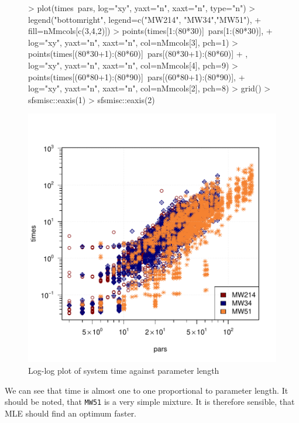 \begin{figure}[h!]
    \begin{Rgraph}[0.9]
\begin{Schunk}
\begin{Sinput}
>     plot(times~pars, log="xy", yaxt="n", xaxt="n", type="n")
>     legend("bottomright", legend=c("MW214", "MW34","MW51"),
+            fill=nMmcols[c(3,4,2)])
>     points(times[1:(80*30)]~pars[1:(80*30)], 
+            log="xy", yaxt="n", xaxt="n", col=nMmcols[3], pch=1)
>     points(times[(80*30+1):(80*60)]~pars[(80*30+1):(80*60)]
+            , log="xy", yaxt="n", xaxt="n", col=nMmcols[4], pch=9)
>     points(times[(60*80+1):(80*90)]~pars[(60*80+1):(80*90)], 
+            log="xy", yaxt="n", xaxt="n", col=nMmcols[2], pch=8)
>     grid()
>     sfsmisc::eaxis(1)
>     sfsmisc::eaxis(2)
\end{Sinput}
\end{Schunk}
\includegraphics{chapter3-figtime}
    \caption{Log-log plot of system time against parameter length}
    \label{fig:time}
    \end{Rgraph}
\end{figure}

We can see that time is almost one to one proportional to parameter length.
It should be noted, that {\tt MW51} is a very simple mixture. It is therefore 
sensible, that MLE should find an optimum faster.

